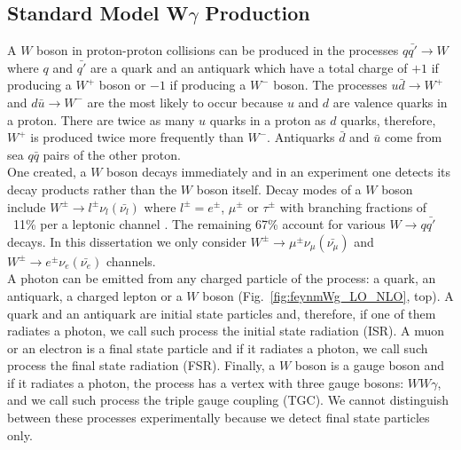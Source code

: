 \subsection{Standard Model W$\gamma$ Production}
\label{sec:WgAbout_SMproduction}

A $W$ boson in proton-proton collisions can be produced in the processes $q {\bar{q'}} \rightarrow W$ where $q$ and $\bar{q'}$ are a quark and an antiquark which have a total charge of $+1$ if producing a $W^+$ boson or $-1$ if producing a $W^-$ boson. The processes $u\bar{d}\rightarrow W^+$ and $d\bar{u}\rightarrow W^-$ are the most likely to occur because $u$ and $d$ are valence quarks in a proton. There are twice as many $u$ quarks in a proton as $d$ quarks, therefore, $W^+$ is produced twice more frequently than $W^-$. Antiquarks $\bar{d}$ and $\bar{u}$ come from sea $q\bar{q}$ pairs of the other proton.\\

One created, a $W$ boson decays immediately and in an experiment one detects its decay products rather than the $W$ boson itself. Decay modes of a $W$ boson include $W^\pm \rightarrow l^\pm \nu_l ({\bar{\nu_l}})$ where $l^\pm=e^\pm$, $\mu^\pm$ or $\tau^\pm$ with branching fractions of ~11\% per a leptonic channel \cite{ref_PDG}. The remaining 67\% account for various $W\rightarrow q\bar{q'}$ decays. In this dissertation we only consider $W^\pm \rightarrow \mu^\pm \nu_\mu ({\bar{\nu_\mu}})$ and $W^\pm \rightarrow e^\pm \nu_e ({\bar{\nu_e}})$ channels.\\


A photon can be emitted from any charged particle of the process: a quark, an antiquark, a charged lepton or a $W$ boson (Fig.~\ref{fig:feynmWg_LO_NLO}, top). A quark and an antiquark are initial state particles and, therefore, if one of them radiates a photon, we call such process the initial state radiation (ISR). A muon or an electron is a final state particle and if it radiates a photon, we call such process the final state radiation (FSR). Finally, a $W$ boson is a gauge boson and if it radiates a photon, the process has a vertex with three gauge bosons: $WW\gamma$, and we call such process the triple gauge coupling (TGC). We cannot distinguish between these processes experimentally because we detect final state particles only.\\


